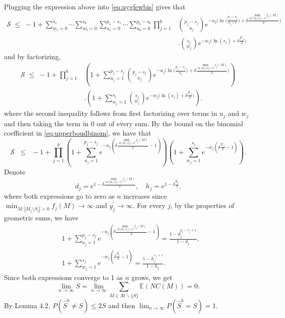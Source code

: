 \documentclass[bj,authoryear]{imsart}
\theoremstyle{plain}
\newcommand{\E}{\mathbb{E}}
\begin{document}
Plugging the expression above into \eqref{eq:uygfewbis} gives that
\begin{align*}
    \mathcal{S} 
    \;\leq\; -1+\sum_{w_1=0}^{s_1}\cdots\sum_{w_b=0}^{s_b}\sum_{u_1=0}^{p_1-s_1}\cdots\sum_{u_b=0}^{p_b-s_b}\prod_{j=1}^b & {\binom{p_j-s_j}{u_j}}e^{- u_j\big(\ln\big(\tfrac{p_j-s_j}{u_j\vee 1}\big)+\delta \tfrac{\min_{M: |M_j\setminus S_j|>0}f_j(M)}{2}\big)}\\&. {\binom{s_j}{w_j}}e^{-w_j\big(\ln(s_j)+\delta \tfrac{g'_j}{2}\big)}
\end{align*}
and by factorizing,
\begin{align*}
    \mathcal{S}\;\leq\; -1+ \prod_{j=1}^b&\left(1+\sum_{u_j=1}^{p_j-s_j}{\binom{p_j-s_j}{u_j}}e^{- u_j\big(\ln\big(\tfrac{p_j-s_j}{u_j}\big)+\delta \tfrac{\min_{M: |M_j\setminus S_j|>0}f_j(M)}{2}\big)}\right)\\&.\left(1+
    \sum_{w_j=1}^{s_j}{\binom{s_j}{w_j}}
    e^{-w_j\big(\ln(s_j)+\delta \tfrac{g'_j}{2}\big)}\right).
\end{align*}
where the second inequality follows from first factorizing over terms in $u_j$ and $w_j$ and then taking the term in 0 out of every sum.
By the bound on the binomial coefficient in \eqref{eq:upperboudbinom}, we have that
\begin{equation}\label{eq:upperbound_sumprobbis}
    \mathcal{S} \;\;\leq\;\; -1+\prod_{j=1}^b\left(1+\sum_{u_j=1}^{p_j-s_j}e^{-u_j\left(\delta \tfrac{\min_{M: |M_j\setminus S_j|>0}f_j(M)}{2}-1\right)}\right)\left(1+
    \sum_{w_j=1}^{s_j}    e^{-w_j\left(\delta \tfrac{g'_j}{2}-1\right)}\right).
\end{equation}
Denote
$$
d_j=e^{1-\delta \frac{\min_{M: |M_j\setminus S_j|>0}f_j(M)}{2}}, \quad h_j=e^{1-\delta \frac{g_j^{\prime}}{2}}.
$$
where both expressions go to zero as $n$ increases since $\min_{M: |M_j\setminus S_j|>0}f_j(M) \rightarrow \infty$ and $g_j^{\prime} \rightarrow \infty$. For every $j$, by the properties of geometric sums, we have
$$
\begin{aligned}
& 1+\sum_{u_j=1}^{p_j-s_j} e^{-u_j\left(\delta \frac{\min_{M: |M_j\setminus S_j|>0}f_j(M)}{2}-1\right)}=\frac{1-d_j^{p_j-s_j+1}}{1-d_j}, \\
& 1+\sum_{w_j=1}^{s_j} e^{-w_j\left(\delta \frac{g_j^{\prime}}{2}-1\right)}=\frac{1-h_j^{s_j+1}}{1-h_j}.
\end{aligned}
$$
Since both expressions converge to 1 as $n$ grows, we get $$\lim _{n \rightarrow \infty} S=\lim _{n \rightarrow \infty} \sum_{M \in \mathcal{M} \backslash\{S\}}\E(NC(M))=0.$$ By Lemma 4.2, $P\left(\hat{S}^b \neq S\right) \leq 2 S$ and then $\lim _{n \rightarrow \infty} P\left(\hat{S}^b=S\right)=1$.
\end{document}
